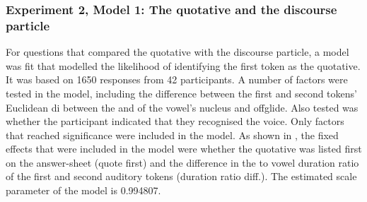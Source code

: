 \subsubsection{Experiment 2, Model 1: The quotative and the discourse particle}

For questions that compared the quotative with the discourse particle, a model was fit that modelled the likelihood of identifying the first token as the quotative. It was based on 1650 responses from 42 participants. A number of factors were tested in the model, including the difference between the first and second tokens' Euclidean di between the  and  of the vowel's nucleus and offglide. Also tested was whether the participant indicated that they recognised the voice. Only factors that reached significance were included in the model. As shown in , the fixed effects that were included in the model were whether the quotative was listed first on the answer-sheet (quote first) and the difference in the  to vowel duration ratio of the first and second auditory tokens (duration ratio diff.). The estimated scale parameter of the model is 0.994807. 



